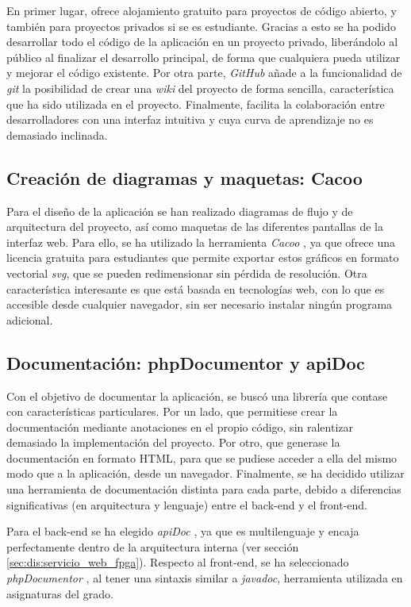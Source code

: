 En primer lugar, ofrece alojamiento gratuito para proyectos de código abierto, y también para proyectos privados si se es estudiante. Gracias a esto se ha podido desarrollar todo el código de la aplicación en un proyecto privado, liberándolo al público al finalizar el desarrollo principal, de forma que cualquiera pueda utilizar y mejorar el código existente. 
Por otra parte, \textit{GitHub} añade a la funcionalidad de \textit{git} la posibilidad de crear una \textit{wiki} del proyecto de forma sencilla, característica que ha sido utilizada en el proyecto.
Finalmente, facilita la colaboración entre desarrolladores con una interfaz intuitiva y cuya curva de aprendizaje no es demasiado inclinada. 

\subsection*{Creación de diagramas y maquetas: Cacoo\label{ssec:dp:cacoo}}

Para el diseño de la aplicación se han realizado diagramas de flujo y de arquitectura del proyecto, así como maquetas de las diferentes pantallas de la interfaz web. Para ello, se ha utilizado la herramienta \textit{Cacoo} \cite{cacoo}, ya que ofrece una licencia gratuita para estudiantes que permite exportar estos gráficos en formato vectorial \textit{svg}, que se pueden redimensionar sin pérdida de resolución. Otra característica interesante es que está basada en tecnologías web, con lo que es accesible desde cualquier navegador, sin ser necesario instalar ningún programa adicional.

\subsection*{Documentación: phpDocumentor y apiDoc\label{ssec:dp:docs}}

Con el objetivo de documentar la aplicación, se buscó una librería que contase con características particulares.
Por un lado, que permitiese crear la documentación mediante anotaciones en el propio código, sin ralentizar demasiado la implementación del proyecto.
Por otro, que generase la documentación en formato \gls{HTML}, para que se pudiese acceder a ella del mismo modo que a la aplicación, desde un navegador.
Finalmente, se ha decidido utilizar una herramienta de documentación distinta para cada parte, debido a diferencias significativas (en arquitectura y lenguaje) entre el \gls{back-end} y el \gls{front-end}.

Para el \gls{back-end} se ha elegido \textit{apiDoc} \cite{apidoc}, ya que es multilenguaje y encaja perfectamente dentro de la arquitectura interna (ver sección \ref{sec:dis:servicio_web_fpga}).
Respecto al \gls{front-end}, se ha seleccionado \textit{phpDocumentor} \cite{phpdocumentor}, al tener una sintaxis similar a \textit{javadoc}, herramienta utilizada en asignaturas del grado.

